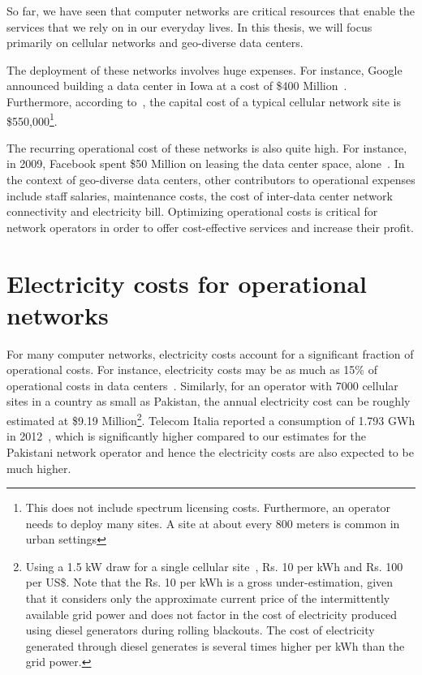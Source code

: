 So far, we have seen that computer networks are critical resources that enable the services that we rely on in our everyday lives. In this thesis, we will focus primarily on cellular networks and geo-diverse data centers. 

The deployment of these networks involves huge expenses. For instance, Google announced building a data center in Iowa at a cost of \$400 Million~\cite{CostOfADC}. Furthermore, according to~\cite{costcellsite}, the capital cost of a typical cellular network site is \$550,000\footnote{This does not include spectrum licensing costs. Furthermore, an operator needs to deploy many sites. A site at about every 800 meters is common in urban settings}. 

The recurring operational cost of these networks is also quite high. For instance, in 2009, Facebook spent \$50 Million on leasing the data center space, alone~\cite{FBLease}. In the context of geo-diverse data centers, other contributors to operational expenses include staff salaries, maintenance costs, the cost of inter-data center network connectivity and electricity bill. Optimizing operational costs is critical for network operators in order to offer cost-effective services and increase their profit.

\section{Electricity costs for operational networks} 
For many computer networks, electricity costs account for a significant fraction of operational costs. For instance, electricity costs may be as much as 15\% of operational costs in data centers~\cite{costCloud}. Similarly, for an operator with 7000 cellular sites in a country as small as Pakistan, the annual electricity cost can be roughly estimated at \$9.19 Million\footnote{Using a 1.5 kW draw for a single cellular site~\cite{mbakwe:btshybribpower:2011:necec}, Rs. 10 per kWh and Rs. 100 per US\$. Note that the Rs. 10 per kWh is a gross under-estimation, given that it considers only the approximate current price of the intermittently available grid power and does not factor in the cost of electricity produced using diesel generators during rolling blackouts. The cost of electricity generated through diesel generates is several times higher per kWh than the grid power.}. Telecom Italia reported a consumption of 1.793 GWh in 2012~\cite{TIAnnualReport}, which is significantly higher compared to our estimates for the Pakistani network operator and hence the electricity costs are also expected to be much higher. 

